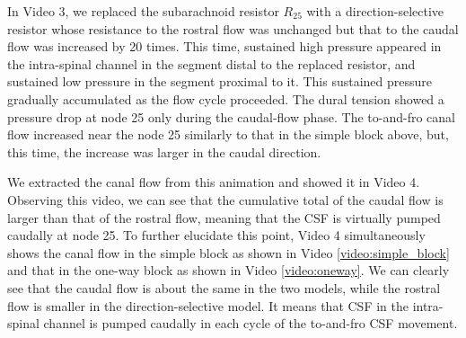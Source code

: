\documentclass[fleqn,10pt]{wlscirep}
\begin{document}
%

%

In Video 3, we replaced the subarachnoid resistor $R_{25}$
with a direction-selective resistor whose resistance to the rostral flow
was unchanged but that to the caudal flow was increased by 20 times. This
time, sustained high pressure
appeared in the intra-spinal channel in the segment distal to the replaced
resistor, and sustained low pressure in the segment proximal to it. This
sustained pressure gradually accumulated as the flow cycle proceeded. The
dural tension showed a pressure drop at node 25 only during the caudal-flow
phase. The to-and-fro canal flow increased near the node 25 similarly to
that in the simple block above, but, this time, the increase was larger in
the caudal direction.

We extracted the canal flow from this animation and showed it in Video 4.
Observing this video, we can see that the cumulative total of the caudal
flow is larger than that of the rostral flow, meaning that the CSF is
virtually pumped caudally at node 25. To further elucidate this point,
Video 4 simultaneously shows the canal flow in the simple block as shown in
Video \ref{video:simple_block} and that in the one-way block as shown in
Video \ref{video:oneway}. We can clearly see that the caudal flow is about
the same in the two models, while the rostral flow is smaller in the
direction-selective model. It means that CSF in the intra-spinal channel is
pumped caudally in each cycle of the to-and-fro CSF movement.
\end{document}
